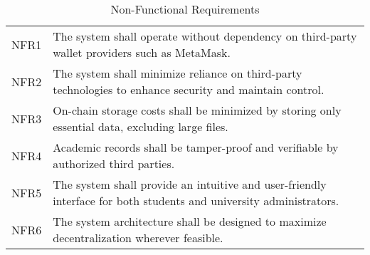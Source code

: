 \begin{table}
\centering
\caption{Non-Functional Requirements}
\label{tab:nonFuncReq}
\begin{tabular}{|p{1.0cm}|p{11cm}|}
\hline
NFR1 & The system shall operate without dependency on third-party wallet providers such as MetaMask. \\
NFR2 & The system shall minimize reliance on third-party technologies to enhance security and maintain control. \\
NFR3 & On-chain storage costs shall be minimized by storing only essential data, excluding large files. \\
NFR4 & Academic records shall be tamper-proof and verifiable by authorized third parties. \\
NFR5 & The system shall provide an intuitive and user-friendly interface for both students and university administrators. \\
NFR6 & The system architecture shall be designed to maximize decentralization wherever feasible. \\
\hline
\end{tabular}
\end{table}